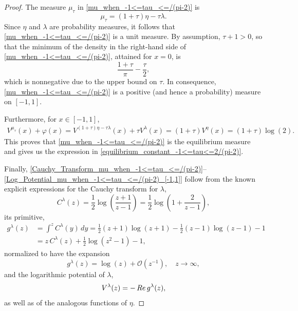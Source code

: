 \documentclass[10pt,a4paper]{amsart}
\renewcommand{\Re}{\mathop{\rm Re}}
\begin{document}
\begin{proof}
    The measure $\mu_\tau$ in \eqref{mu_when_-1<=tau_<=/(pi-2)} is \begin{equation*}\label{Form_of_mu_when_-1<=tau_<=/(pi-2)}
        \mu_\tau=(1+\tau)\eta-\tau\lambda.
    \end{equation*}
    Since $\eta$ and $\lambda$ are probability measures, it follows that \eqref{mu_when_-1<=tau_<=/(pi-2)} is a unit measure. By assumption, $\tau+1>0$, so that the minimum of the density in the right-hand side of \eqref{mu_when_-1<=tau_<=/(pi-2)}, attained for $x=0$, is
    $$
   \frac{1+\tau}{\pi }-\frac{\tau}{2},
    $$
    which is nonnegative due to the upper bound on $\tau$. In consequence, \eqref{mu_when_-1<=tau_<=/(pi-2)} is a positive (and hence a probability) measure on $[-1,1]$.

    Furthermore, for $x\in[-1,1]$,  
    \begin{align*}
      V^{\mu_\tau}(x)+\varphi(x)=   V^{(1+\tau)\eta-\tau\lambda}(x)+\tau V^{\lambda}(x)=(1+\tau)V^\eta(x)=(1+\tau)\log(2).
    \end{align*}
    This proves that \eqref{mu_when_-1<=tau_<=/(pi-2)} is the equilibrium measure and gives us the expression in \eqref{equilibrium_constant_-1<=tau<=2/(pi-2)}. 
    
    Finally, \eqref{Cauchy_Transform_mu_when_-1<=tau_<=/(pi-2)}--\eqref{Log_Potential_mu_when_-1<=tau_<=/(pi-2)_[-1,1]} follow from the known explicit expressions for the Cauchy transform for $\lambda$,
    \begin{equation*} \label{CauchyforLebesgue}
        C^{\lambda}(z)= \frac{1}{2}\log\left(\frac{z+1}{z-1}\right)=\frac{1}{2}\log\left(1+\frac{2}{z-1}\right),
    \end{equation*}
    its primitive,
    \begin{equation} \label{GforLebesgue}
    \begin{split}
        g^{\lambda}(z)&=\int^z C^{\lambda}(y)\, dy= \frac{1}{2} (z+1) \log (z+1)-\frac{1}{2} (z-1) \log (z-1)-1 \\
        &= z \, C^{\lambda}(z)+\frac{1}{2}  \log (z^2-1) -1,
         \end{split}
    \end{equation}
    normalized to have the expansion
    $$
    g^{\lambda}(z)=\log(z)+\mathcal O(z^{-1}), \quad z\to\infty, 
    $$
    and the logarithmic potential of $\lambda$,
    $$
    V^{\lambda}(z)=-\Re g^{\lambda}(z),
    $$
    as well as of the analogous functions of $\eta$.
\end{proof}
\end{document}
